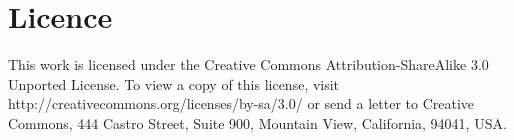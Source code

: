 \documentclass[a4paper]{scrreprt}
\title{}
\author{}
\begin{document}
	\maketitle
	\vspace{\fill}
	\section*{Licence}
	This work is licensed under the Creative Commons Attribution-ShareAlike 3.0 Unported License. To view a copy of this license, visit http://creativecommons.org/licenses/by-sa/3.0/ or send a letter to Creative Commons, 444 Castro Street, Suite 900, Mountain View, California, 94041, USA.
	
\end{document}
